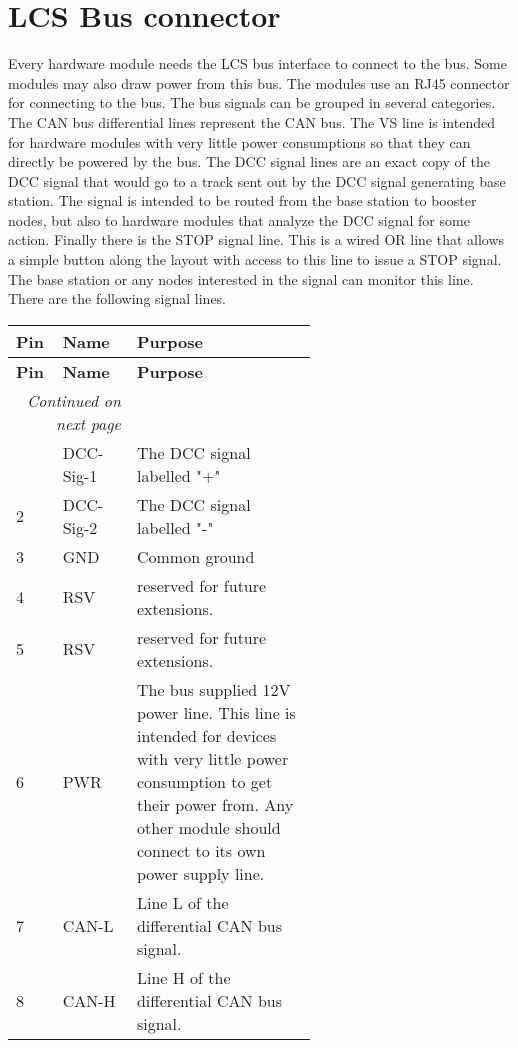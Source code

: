 \section{LCS Bus connector}

Every hardware module needs the LCS bus interface to connect to the bus. Some modules may also draw power from this bus. The modules use an RJ45 connector for connecting to the bus. The bus signals can be grouped in several categories. The CAN bus differential lines represent the CAN bus. The VS line is intended for hardware modules with very little power consumptions so that they can directly be powered by the bus. The DCC signal lines are an exact copy of the DCC signal that would go to a track sent out by the DCC signal generating base station. The signal is intended to be routed from the base station to booster nodes, but also to hardware modules that analyze the DCC signal for some action. Finally there is the STOP signal line. This is a wired OR line that allows a simple button along the layout with access to this line to issue a STOP signal. The base station or any nodes interested in the signal can monitor this line. There are the following signal lines.

\begin{center}
    \begin{longtable}{@{}|l|l|p{0.6\linewidth}|@{}}
        \toprule
        \textbf{Pin} & \textbf{Name} & \textbf{Purpose} \\
        \midrule
        \endfirsthead
        \toprule
        \textbf{Pin} & \textbf{Name} & \textbf{Purpose} \\
        \midrule
        \endhead
        \midrule
        \multicolumn{2}{r}{\textit{Continued on next page}} \\
        \midrule
        \endfoot
        \bottomrule
        \endlastfoot
        1 & DCC-Sig-1 & The DCC signal labelled "+" \\
        \midrule
        2 & DCC-Sig-2 & The DCC signal labelled "-" \\
        \midrule
        3 & GND & Common ground \\
        \midrule
        4 & RSV & reserved for future extensions. \\
        \midrule
        5 & RSV & reserved for future extensions. \\
        \midrule
        6 & PWR & The bus supplied 12V power line. This line is intended for devices with very little power consumption to get their power from. Any other module should connect to its own power supply line. \\
        \midrule
        7 & CAN-L &  Line L of the differential CAN bus signal. \\
        \midrule
        8 & CAN-H &  Line H of the differential CAN bus signal. \\
    \end{longtable}
\end{center}

